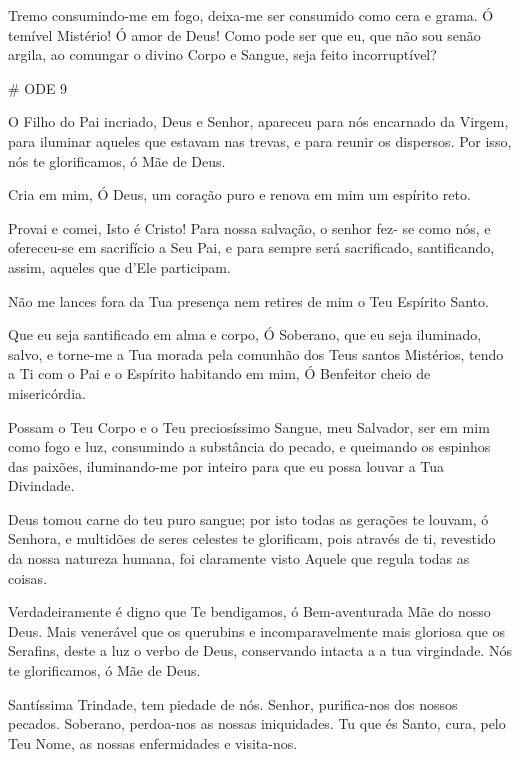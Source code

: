 \documentclass{subfiles}
\begin{document}
\Doxology{}

Tremo consumindo-me em fogo, deixa-me ser consumido como cera e grama. Ó temível
Mistério! Ó amor de Deus! Como pode ser que eu, que não sou senão argila, ao
comungar o divino Corpo e Sangue, seja feito incorruptível?

# ODE 9

\eirmos{}O Filho do Pai incriado, Deus e Senhor, apareceu para nós encarnado
da Virgem, para iluminar aqueles que estavam nas trevas, e para reunir os
dispersos. Por isso, nós te glorificamos, ó Mãe de Deus.

Cria em mim, Ó Deus, um coração puro e renova em mim um espírito reto.

Provai e comei, Isto é Cristo! Para nossa salvação, o senhor fez- se
como nós, e ofereceu-se em sacrifício a Seu Pai, e para sempre será sacrificado,
santificando, assim, aqueles que d’Ele participam.

Não me lances fora da Tua presença nem retires de mim o Teu Espírito Santo.

Que eu seja santificado em alma e corpo, Ó Soberano, que eu seja
iluminado, salvo, e torne-me a Tua morada pela comunhão dos Teus santos
Mistérios, tendo a Ti com o Pai e o Espírito habitando em mim, Ó Benfeitor
cheio de misericórdia.

\doxology{}

Possam o Teu Corpo e o Teu preciosíssimo Sangue, meu Salvador, ser em mim como
fogo e luz, consumindo a substância do pecado, e queimando os espinhos das
paixões, iluminando-me por inteiro para que eu possa louvar a Tua Divindade.

\nowandever{}

Deus tomou carne do teu puro sangue; por isto todas as gerações te
louvam, ó Senhora, e multidões de seres celestes te glorificam, pois através de
ti, revestido da nossa natureza humana, foi claramente visto Aquele que regula
todas as coisas.


Verdadeiramente é digno que Te bendigamos, ó Bem-aventurada Mãe
do nosso Deus. Mais venerável que os querubins e incomparavelmente mais
gloriosa que os Serafins, deste a luz o verbo de Deus, conservando intacta a a
tua virgindade. Nós te glorificamos, ó Mãe de Deus.

\trisagion{} \thrice{}

Santíssima Trindade, tem piedade de nós. Senhor, purifica-nos dos
nossos pecados. Soberano, perdoa-nos as nossas iniquidades. Tu que és Santo,
cura, pelo Teu Nome, as nossas enfermidades e visita-nos.
\end{document}
